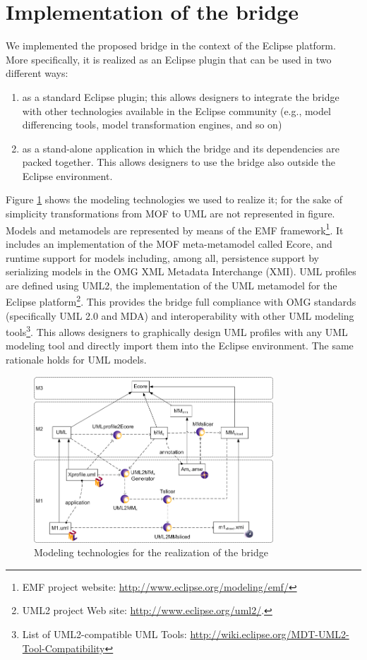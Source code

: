 \section{Implementation of the bridge}\label{sec:tool}
We implemented the proposed bridge in the context of the Eclipse platform.
More specifically, it is realized as an Eclipse plugin that can be used in two different ways:
%
\begin{enumerate}
	\item as a standard Eclipse plugin; this allows designers to integrate the bridge
with other technologies available in the Eclipse community (e.g., model differencing tools, model transformation engines, and so on) 
	\item as a stand-alone application in which the bridge and its dependencies are packed together. This allows designers
	to use the bridge also outside the Eclipse environment.
\end{enumerate}
%
Figure \ref{fig:tech} shows the modeling technologies we used to realize it; for the sake of simplicity
transformations from MOF to UML are not represented in figure.
Models and metamodels are represented by means of the EMF 
framework\footnote{EMF project website: \small{\url{http://www.eclipse.org/modeling/emf/}}}.
It includes an implementation of the MOF meta-metamodel called Ecore, and runtime support for models including,
among all, persistence support by serializing models in the OMG XML Metadata Interchange (XMI).
UML profiles are defined using UML2,
the implementation of the UML metamodel for the Eclipse
platform\footnote{UML2 project Web site:
\underline{http://www.eclipse.org/uml2/}.}. 
This provides the bridge full compliance with OMG standards
(specifically UML 2.0 and MDA) and interoperability with other
UML modeling tools\footnote{List of UML2-compatible UML Tools: \small{\url{http://wiki.eclipse.org/MDT-UML2-Tool-Compatibility}}}. This allows designers to graphically design UML
profiles with any UML modeling tool and directly import them into
the Eclipse environment. The same rationale holds for UML models. 
%
\begin{figure}[htbp]
	\centering
		\includegraphics[width=0.80\textwidth]{figures/implementation.png}
	\caption{Modeling technologies for the realization of the bridge}
	\label{fig:tech}
\end{figure}

